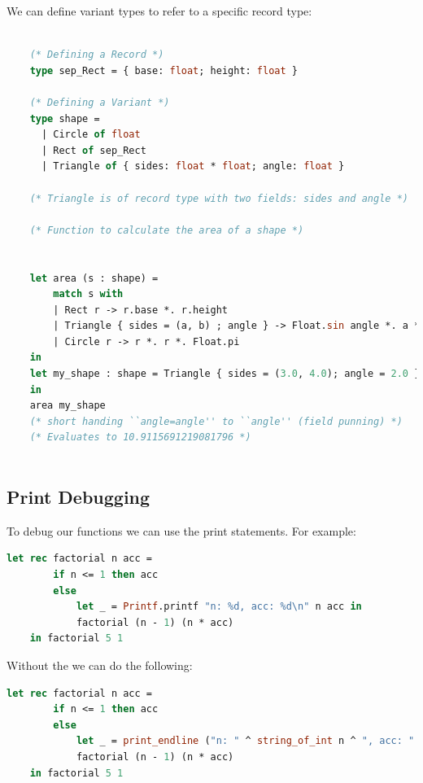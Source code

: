 \begin{Def}

    We can define variant types to refer to a specific record type:

    \begin{lstlisting}[language=OCaml, caption={Variants Carrying Record Fields}, numbers=none]
    
    (* Defining a Record *)
    type sep_Rect = { base: float; height: float }

    (* Defining a Variant *)
    type shape = 
      | Circle of float
      | Rect of sep_Rect
      | Triangle of { sides: float * float; angle: float }
    
    (* Triangle is of record type with two fields: sides and angle *)

    (* Function to calculate the area of a shape *)
    

    let area (s : shape) =
        match s with
        | Rect r -> r.base *. r.height
        | Triangle { sides = (a, b) ; angle } -> Float.sin angle *. a *. b
        | Circle r -> r *. r *. Float.pi
    in 
    let my_shape : shape = Triangle { sides = (3.0, 4.0); angle = 2.0 }
    in
    area my_shape
    (* short handing ``angle=angle'' to ``angle'' (field punning) *)
    (* Evaluates to 10.9115691219081796 *)
    
    \end{lstlisting}
\end{Def}

\newpage 

\subsection{Print Debugging}

To debug our functions we can use the print statements. For example:

\begin{lstlisting}[language=OCaml, caption={Print Debugging}]
    let rec factorial n acc =
        if n <= 1 then acc
        else 
            let _ = Printf.printf "n: %d, acc: %d\n" n acc in
            factorial (n - 1) (n * acc)
    in factorial 5 1
\end{lstlisting}

\noindent
Without the  we can do the following:

\begin{lstlisting}[language=OCaml, caption={Print Debugging Without Printf}]
    let rec factorial n acc =
        if n <= 1 then acc
        else 
            let _ = print_endline ("n: " ^ string_of_int n ^ ", acc: " ^ string_of_int acc) in
            factorial (n - 1) (n * acc)
    in factorial 5 1
\end{lstlisting}

